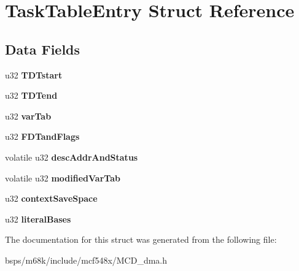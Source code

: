 \hypertarget{structTaskTableEntry}{}\section{Task\+Table\+Entry Struct Reference}
\label{structTaskTableEntry}
\subsection*{Data Fields}
\begin{DoxyCompactItemize}
\item 
\mbox{\label{structTaskTableEntry_a73ee6282b5276a1a54cc4a3495f67758}} 
u32 {\bfseries T\+D\+Tstart}
\item 
\mbox{\label{structTaskTableEntry_aa3c73535617db47dd9607c24ce7b6f23}} 
u32 {\bfseries T\+D\+Tend}
\item 
\mbox{\label{structTaskTableEntry_a540d8a09511990263c18d645af83e18b}} 
u32 {\bfseries var\+Tab}
\item 
\mbox{\label{structTaskTableEntry_a1efc2066cf438473c08fa60355eab743}} 
u32 {\bfseries F\+D\+Tand\+Flags}
\item 
\mbox{\label{structTaskTableEntry_a21e82667f007c770bf7117c639170a83}} 
volatile u32 {\bfseries desc\+Addr\+And\+Status}
\item 
\mbox{\label{structTaskTableEntry_a5ece40d5d25c0183cfacef657f654e49}} 
volatile u32 {\bfseries modified\+Var\+Tab}
\item 
\mbox{\label{structTaskTableEntry_a0edbd73b5657481b15cf5e07fa944bd0}} 
u32 {\bfseries context\+Save\+Space}
\item 
\mbox{\label{structTaskTableEntry_ae0d86a134e3ede3a2caed8143ad62427}} 
u32 {\bfseries literal\+Bases}
\end{DoxyCompactItemize}


The documentation for this struct was generated from the following file\+:\begin{DoxyCompactItemize}
\item 
bsps/m68k/include/mcf548x/M\+C\+D\+\_\+dma.\+h\end{DoxyCompactItemize}
